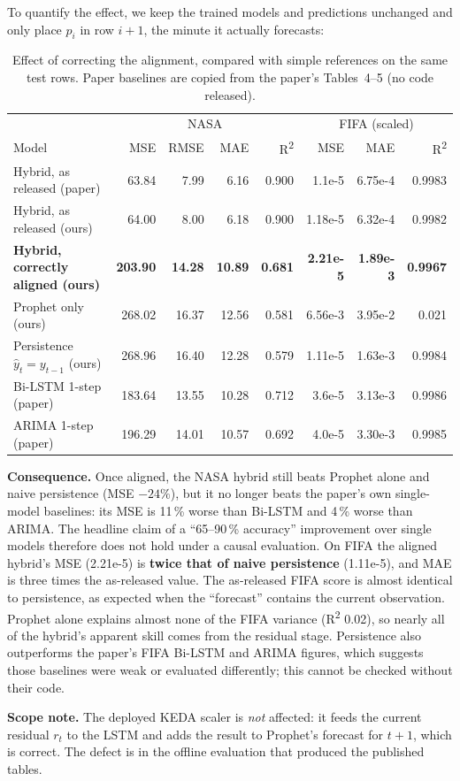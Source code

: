 \documentclass[11pt,a4paper]{article}
\newcommand{\FIFAMSEs}{1.18e-5}   \newcommand{\FIFAMAEs}{6.32e-4}   \newcommand{\FIFARsqs}{0.9982}
\newcommand{\FIFAalMSE}{2.21e-5}  \newcommand{\FIFAalMAE}{1.89e-3}  \newcommand{\FIFAalRsq}{0.9967}
\newcommand{\FIFAprMSE}{6.56e-3}  \newcommand{\FIFAprMAE}{3.95e-2}  \newcommand{\FIFAprRsq}{0.021}
\newcommand{\FIFApeMSE}{1.11e-5}  \newcommand{\FIFApeMAE}{1.63e-3}  \newcommand{\FIFApeRsq}{0.9984}
\newcommand{\FIFAconsequence}{On FIFA the aligned hybrid's MSE (2.21e-5) is \textbf{twice that of naive persistence} (1.11e-5), and MAE is three times the as-released value. The as-released FIFA score is almost identical to persistence, as expected when the ``forecast'' contains the current observation. Prophet alone explains almost none of the FIFA variance (R\textsuperscript{2} 0.02), so nearly all of the hybrid's apparent skill comes from the residual stage. Persistence also outperforms the paper's FIFA Bi-LSTM and ARIMA figures, which suggests those baselines were weak or evaluated differently; this cannot be checked without their code.}
\begin{document}
To quantify the effect, we keep the trained models and predictions unchanged and only place $p_i$ in row $i{+}1$, the minute it actually forecasts:

\begin{table}[h]\centering\small
\caption{Effect of correcting the alignment, compared with simple references on the same test rows. Paper baselines are copied from the paper's Tables~4--5 (no code released).}\label{tab:audit}
\begin{tabular}{@{}lrrrr|rrr@{}}\toprule
 & \multicolumn{4}{c|}{NASA} & \multicolumn{3}{c}{FIFA (scaled)}\\
Model & MSE & RMSE & MAE & R\textsuperscript{2} & MSE & MAE & R\textsuperscript{2}\\\midrule
Hybrid, as released (paper)    & 63.84 & 7.99 & 6.16 & 0.900 & 1.1e-5 & 6.75e-4 & 0.9983\\
Hybrid, as released (ours)     & 64.00 & 8.00 & 6.18 & 0.900 & \FIFAMSEs & \FIFAMAEs & \FIFARsqs\\
\textbf{Hybrid, correctly aligned (ours)} & \textbf{203.90} & \textbf{14.28} & \textbf{10.89} & \textbf{0.681} & \textbf{\FIFAalMSE} & \textbf{\FIFAalMAE} & \textbf{\FIFAalRsq}\\
Prophet only (ours)            & 268.02 & 16.37 & 12.56 & 0.581 & \FIFAprMSE & \FIFAprMAE & \FIFAprRsq\\
Persistence $\hat{y}_t=y_{t-1}$ (ours) & 268.96 & 16.40 & 12.28 & 0.579 & \FIFApeMSE & \FIFApeMAE & \FIFApeRsq\\
Bi-LSTM 1-step (paper)         & 183.64 & 13.55 & 10.28 & 0.712 & 3.6e-5 & 3.13e-3 & 0.9986\\
ARIMA 1-step (paper)           & 196.29 & 14.01 & 10.57 & 0.692 & 4.0e-5 & 3.30e-3 & 0.9985\\
\bottomrule\end{tabular}
\end{table}

\noindent\textbf{Consequence.} Once aligned, the NASA hybrid still beats Prophet alone and naive persistence (MSE $-24\%$), but it no longer beats the paper's own single-model baselines: its MSE is 11\,\% worse than Bi-LSTM and 4\,\% worse than ARIMA. The headline claim of a ``65--90\,\% accuracy'' improvement over single models therefore does not hold under a causal evaluation. \FIFAconsequence

\noindent\textbf{Scope note.} The deployed KEDA scaler is \emph{not} affected: it feeds the current residual $r_t$ to the LSTM and adds the result to Prophet's forecast for $t{+}1$, which is correct. The defect is in the offline evaluation that produced the published tables.
\end{document}
